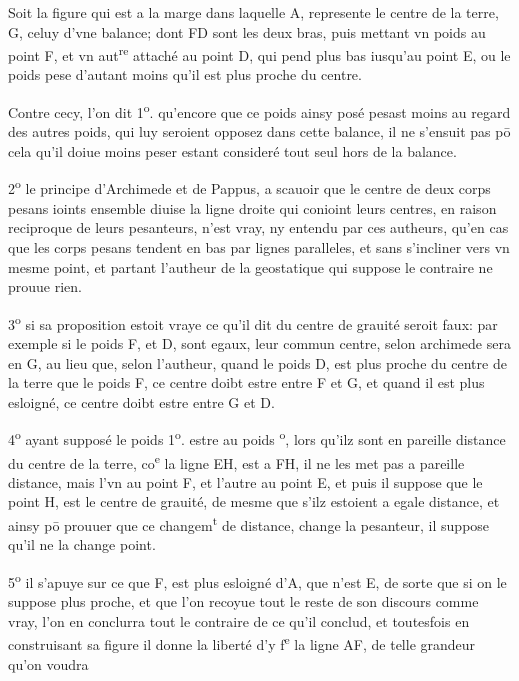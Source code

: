 \documentclass[11pt,a4paper]{article}
\begin{document}
Soit la figure qui est a la marge dans laquelle A, represente le centre de la terre, G, celuy d'vne balance; dont FD sont les deux bras, puis mettant vn poids au point F, et vn aut\textsuperscript{re} attaché au point D, qui pend plus bas iusqu'au point E, ou le poids pese d'autant moins qu'il est plus proche du centre.

Contre cecy, l'on dit 1\textsuperscript{o}. qu'encore que ce poids ainsy posé pesast moins au regard des autres poids, qui luy seroient opposez dans cette balance, il ne s'ensuit pas pō cela qu'il doiue moins peser estant consideré tout seul hors de la balance.

2\textsuperscript{o} le principe d'Archimede et de Pappus, a scauoir que le centre de deux corps pesans ioints ensemble diuise la ligne droite qui conioint leurs centres, en raison reciproque de leurs pesanteurs, n'est vray, ny entendu par ces autheurs, qu'en cas que les corps pesans tendent en bas par lignes paralleles, et sans s'incliner vers vn mesme point, et partant l'autheur de la geostatique qui suppose le contraire ne prouue rien.

3\textsuperscript{o} si sa proposition estoit vraye ce qu'il dit du centre de grauité seroit faux: par exemple si le poids F, et D, sont egaux, leur commun centre, selon archimede sera en G, au lieu que, selon l'autheur, quand le poids D, est plus proche du centre de la terre que le poids F, ce centre doibt estre entre F et G, et quand il est plus esloigné, ce centre doibt estre entre G et D.

4\textsuperscript{o} ayant supposé le poids 1\textsuperscript{o}. estre au poids \textsuperscript{o}, lors qu'ilz sont en pareille distance du centre de la terre, co\textsuperscript{e} la ligne EH, est a FH, il ne les met pas a pareille distance, mais l'vn au point F, et l'autre au point E, et puis il suppose que le point H, est le centre de grauité, de mesme que s'ilz estoient a egale distance, et ainsy pō prouuer que ce changem\textsuperscript{t} de distance, change la pesanteur, il suppose qu'il ne la change point.

5\textsuperscript{o} il s'apuye sur ce que F, est plus esloigné d'A, que n'est E, de sorte que si on le suppose plus proche, et que l'on recoyue tout le reste de son discours comme vray, l'on en conclurra tout le contraire de ce qu'il conclud, et toutesfois en construisant sa figure il donne la liberté d'y f\textsuperscript{e} la ligne AF, de telle grandeur qu'on voudra
\end{document}
